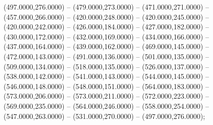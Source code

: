 \begin{scope}[shift={(-419.87,-133.87)}]
  \begin{scope}[draw=black,fill=black,line join=round,line width=0.208pt]
       (497.0000,276.0000) -- (479.0000,273.0000) --
        (471.0000,271.0000) -- (457.0000,266.0000) -- (420.0000,248.0000) --
        (420.0000,245.0000) -- (420.0000,242.0000) -- (426.0000,184.0000) --
        (427.0000,182.0000) -- (430.0000,172.0000) -- (432.0000,169.0000) --
        (434.0000,166.0000) -- (437.0000,164.0000) -- (439.0000,162.0000) --
        (469.0000,145.0000) -- (472.0000,143.0000) -- (491.0000,136.0000) --
        (501.0000,135.0000) -- (509.0000,134.0000) -- (518.0000,135.0000) --
        (526.0000,137.0000) -- (538.0000,142.0000) -- (541.0000,143.0000) --
        (544.0000,145.0000) -- (546.0000,148.0000) -- (548.0000,151.0000) --
        (564.0000,183.0000) -- (573.0000,206.0000) -- (573.0000,211.0000) --
        (572.0000,223.0000) -- (569.0000,235.0000) -- (564.0000,246.0000) --
        (558.0000,254.0000) -- (547.0000,263.0000) -- (531.0000,270.0000) --
        (497.0000,276.0000);
  \end{scope}
\end{scope}
